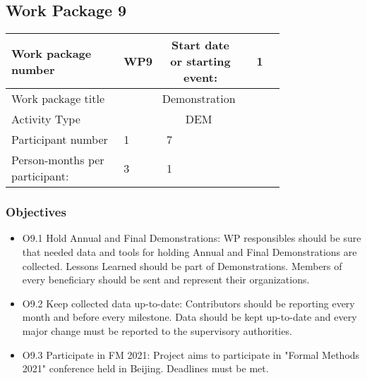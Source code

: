 \subsection{Work Package 9}

\begin{table}[hbpt]\centering
	\begin{tabular}{|p{0.35\linewidth}|p{0.06\linewidth}|p{0.06\linewidth}|p{0.06\linewidth}|
         p{0.06\linewidth}|p{0.06\linewidth}|p{0.06\linewidth}|p{0.06\linewidth}|}\hline
		 Work package number& WP9 &
		 \multicolumn{4}{|c|}{Start date or starting event:}{}&
		 \multicolumn{2}{|c|}{                        1 }{}\\\hline
		 Work package title&\multicolumn{7}{|c|}{ Demonstration }{}\\\hline
		 Activity Type&\multicolumn{7}{|c|}{      DEM }{}\\\hline
		 Participant number & 1 & 7 & ~ & ~ & ~ & ~ & ~ \\\hline
		 Person-months per participant: & 3 & 1 & ~ & ~ & ~ & ~ & ~ \\\hline
	\end{tabular}
\end{table}

\subsubsection{Objectives}
	\begin{itemize}
		\item O9.1 Hold Annual and Final Demonstrations: WP responsibles  should be sure that needed data and tools for holding Annual and Final Demonstrations are collected. Lessons Learned should be part of Demonstrations. Members of every beneficiary should be sent and represent their organizations. 
		
		\item O9.2 Keep collected data up-to-date: Contributors should be reporting every month and before every milestone. Data should be kept up-to-date and every major change must be reported to the supervisory authorities.
		
		\item O9.3 Participate in FM 2021: Project aims to participate in "Formal Methods 2021" conference held in Beijing. Deadlines must be met.
	\end{itemize}


